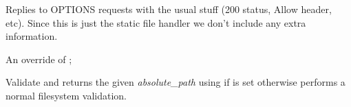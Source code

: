 \documentclass[letterpaper,10pt,openany]{sphinxmanual}
\begin{document}
\begin{fulllineitems}

\begin{fulllineitems}
\label{Developer/server:gateone.core.server.StaticHandler.options}
Replies to OPTIONS requests with the usual stuff (200 status, Allow
header, etc).  Since this is just the static file handler we don't
include any extra information.

\end{fulllineitems}


\begin{fulllineitems}
\label{Developer/server:gateone.core.server.StaticHandler.validate_absolute_path}
An override of
;

Validate and returns the given \emph{absolute\_path} using 
if  is set otherwise performs a normal filesystem
validation.

\end{fulllineitems}


\end{fulllineitems}

\end{document}
